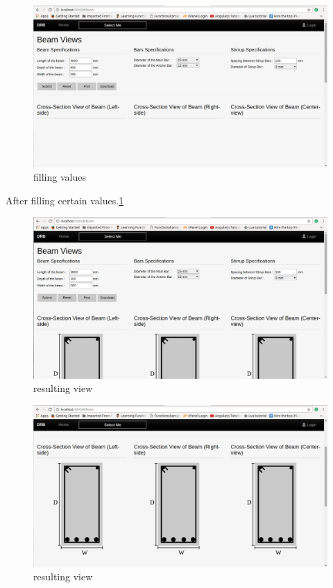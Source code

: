 \begin{figure}[H] 
\centering \includegraphics[scale=0.32]{images/output/screen3.png}
\caption{filling values}
\label{fig:3}
\end{figure}

After filling certain values.\ref{fig:3}

\begin{figure}[H] 
\centering \includegraphics[scale=0.31]{images/output/screen4.png}
\caption{resulting view}
\label{fig:4}
\end{figure}

\begin{figure}[H] 
\centering \includegraphics[scale=0.31]{images/output/screen5.png}
\caption{resulting view}
\label{fig:5}
\end{figure}

